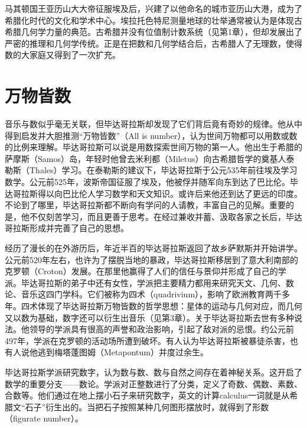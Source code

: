 \documentclass[b5paper]{ctexart}
\begin{document}
马其顿国王亚历山大大帝征服埃及后，兴建了以他命名的城市亚历山大港，成为了希腊化时代的文化和学术中心。埃拉托色特尼测量地球的壮举通常被认为是体现古希腊几何学力量的典范。古希腊并没有位值制计数系统（见第1章），但却发展出了严密的推理和几何学传统。正是在把数和几何学结合后，古希腊人了无理数，使得数的大家庭又得到了一次扩充。

\section{万物皆数}
音乐与数似乎毫无关联，但毕达哥拉斯却发现了它们背后竟有奇妙的规律。他从中得到启发并大胆推测“万物皆数”（All is number），认为世间万物都可以用数或数的比例来理解。毕达哥拉斯可以说是用数探索世间万物的第一人。他出生于希腊的萨摩斯（Samos）岛，年轻时他曾去米利都（Miletus）向古希腊哲学的奠基人泰勒斯（Thales）学习。在泰勒斯的建议下，毕达哥拉斯于公元535年前往埃及学习数学。公元前525年，波斯帝国征服了埃及，他被俘并随军向东到达了巴比伦。毕达哥拉斯得以向巴比伦人学习数学和天文知识。或许后来他还到达了更远的印度。不论到了哪里，毕达哥拉斯都不断向有学问的人请教，丰富自己的见解。重要的是，他不仅刻苦学习，而且更善于思考。在经过兼收并蓄、汲取各家之长后，毕达哥拉斯形成并完善了自己的思想\cite{HanXueTao16}。

经历了漫长的在外游历后，年近半百的毕达哥拉斯返回了故乡萨默斯并开始讲学。公元前520年左右，也许为了摆脱当地的暴政，毕达哥拉斯移居到了意大利南部的克罗顿（Croton）发展。在那里他赢得了人们的信任与景仰并形成了自己的学派。毕达哥拉斯的弟子中还有女性，学派把主要精力都用来研究天文、几何、数论、音乐这四门学科。它们被称为四术（quadrivium），影响了欧洲教育两千多年\cite{StepanovRose15}。四术体现了毕达哥拉斯万物皆数的哲学思想：星体的运动与几何对应，而几何又以数为基础，数字还可以衍生出音乐（见第3章）。关于毕达哥拉斯去世有多种说法。他领导的学派具有很高的声誉和政治影响，引起了敌对派的忌恨。约公元前497年，学派在克罗顿的活动场所遭到破坏。有人认为毕达哥拉斯被暴徒杀害，也有人说他逃到梅塔蓬图姆（Metapontum）并度过余生\cite{MKlein1972}。

毕达哥拉斯学派研究数字，认为数与数、数与自然之间存在着神秘关系。这开启了数学的重要分支——数论。学派对正整数进行了分类，定义了奇数、偶数、素数、合数等。他们通过在地上摆小石子来研究数字，英文的计算calculus一词就是从希腊文“石子”衍生出的\cite{HanXueTao16}。当把石子按照某种几何图形摆放时，就得到了形数（figurate number）。
\end{document}
